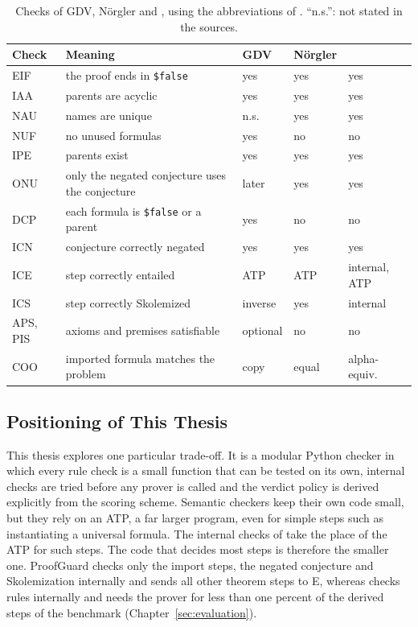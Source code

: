\begin{table}[!htb]
\centering
\small
\caption{Checks of GDV, N\"orgler and \TSTPy{}, using the abbreviations of \citet{taprogge2026lightweight}. ``n.s.'': not stated in the sources.}
\label{tab:check-taxonomy}
\begin{tabular}{@{}l P{5.4cm} l l l@{}}
\toprule
Check & Meaning & GDV & N\"orgler & \TSTPy{} \\
\midrule
EIF & the proof ends in \texttt{\$false} & yes & yes & yes \\
\addlinespace[3pt]
IAA & parents are acyclic & yes & yes & yes \\
\addlinespace[3pt]
NAU & names are unique & n.s. & yes & yes \\
\addlinespace[3pt]
NUF & no unused formulas & yes & no & no \\
\addlinespace[3pt]
IPE & parents exist & yes & yes & yes \\
\addlinespace[3pt]
ONU & only the negated conjecture uses the conjecture & later & yes & yes \\
\addlinespace[3pt]
DCP & each formula is \texttt{\$false} or a parent & yes & no & no \\
\addlinespace[3pt]
ICN & conjecture correctly negated & yes & yes & yes \\
\addlinespace[3pt]
ICE & step correctly entailed & ATP & ATP & internal, ATP \\
\addlinespace[3pt]
ICS & step correctly Skolemized & inverse & yes & internal \\
\addlinespace[3pt]
APS, PIS & axioms and premises satisfiable & optional & no & no \\
\addlinespace[3pt]
COO & imported formula matches the problem & copy & equal & alpha-equiv. \\
\bottomrule
\end{tabular}
\end{table}

\subsection{Positioning of This Thesis}
\label{subsec:rw-positioning}

This thesis explores one particular trade-off.
It is a modular Python checker in which every rule check is a small function that can be tested on its own, internal checks are tried before any prover is called and the verdict policy is derived explicitly from the scoring scheme.
Semantic checkers keep their own code small, but they rely on an ATP, a far larger program, even for simple steps such as instantiating a universal formula.
The internal checks of \TSTPy{} take the place of the ATP for such steps. The code that decides most steps is therefore the smaller one.
ProofGuard checks only the import steps, the negated conjecture and Skolemization internally and sends all other theorem steps to E, whereas \TSTPy{} checks \EvalRulesInternal{} rules internally and needs the prover for less than one percent of the derived steps of the benchmark (Chapter~\ref{sec:evaluation}).
